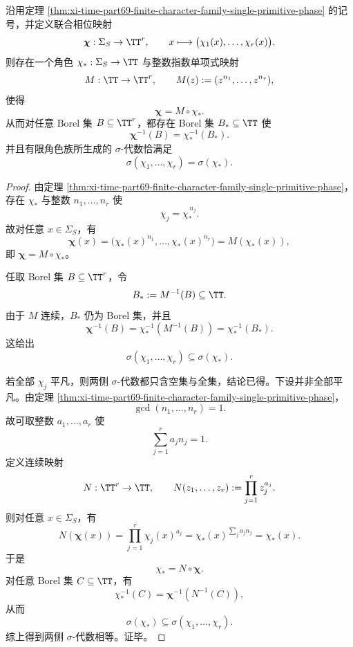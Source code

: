\begin{corollary}\label{cor:xi-time-part69-finite-phase-audit-borel-collapse-single-circle}
沿用定理 \ref{thm:xi-time-part69-finite-character-family-single-primitive-phase} 的记号，并定义联合相位映射
\[
\boldsymbol{\chi}:\Sigma_S\to \TT^r,
\qquad
x\longmapsto \bigl(\chi_1(x),\dots,\chi_r(x)\bigr).
\]
则存在一个角色 \(\chi_\ast:\Sigma_S\to\TT\) 与整数指数单项式映射
\[
M:\TT\to \TT^r,
\qquad
M(z):=(z^{n_1},\dots,z^{n_r}),
\]
使得
\[
\boldsymbol{\chi}=M\circ \chi_\ast.
\]
从而对任意 Borel 集 \(B\subseteq \TT^r\)，都存在 Borel 集 \(B_\ast\subseteq \TT\) 使
\[
\boldsymbol{\chi}^{-1}(B)=\chi_\ast^{-1}(B_\ast).
\]
并且有限角色族所生成的 \(\sigma\)-代数恰满足
\[
\sigma(\chi_1,\dots,\chi_r)=\sigma(\chi_\ast).
\]
\end{corollary}
\begin{proof}
由定理 \ref{thm:xi-time-part69-finite-character-family-single-primitive-phase}，存在 \(\chi_\ast\) 与整数 \(n_1,\dots,n_r\) 使
\[
\chi_j=\chi_\ast^{\,n_j}.
\]
故对任意 \(x\in \Sigma_S\)，有
\[
\boldsymbol{\chi}(x)
=
\bigl(\chi_\ast(x)^{n_1},\dots,\chi_\ast(x)^{n_r}\bigr)
=
M(\chi_\ast(x)),
\]
即 \(\boldsymbol{\chi}=M\circ \chi_\ast\)。

任取 Borel 集 \(B\subseteq \TT^r\)，令
\[
B_\ast:=M^{-1}(B)\subseteq \TT.
\]
由于 \(M\) 连续，\(B_\ast\) 仍为 Borel 集，并且
\[
\boldsymbol{\chi}^{-1}(B)
=
\chi_\ast^{-1}(M^{-1}(B))
=
\chi_\ast^{-1}(B_\ast).
\]
这给出
\[
\sigma(\chi_1,\dots,\chi_r)\subseteq \sigma(\chi_\ast).
\]

若全部 \(\chi_j\) 平凡，则两侧 \(\sigma\)-代数都只含空集与全集，结论已得。下设并非全部平凡。由定理 \ref{thm:xi-time-part69-finite-character-family-single-primitive-phase}，
\[
\gcd(n_1,\dots,n_r)=1.
\]
故可取整数 \(a_1,\dots,a_r\) 使
\[
\sum_{j=1}^{r}a_j n_j=1.
\]
定义连续映射
\[
N:\TT^r\to \TT,
\qquad
N(z_1,\dots,z_r):=\prod_{j=1}^{r}z_j^{a_j}.
\]
则对任意 \(x\in \Sigma_S\)，有
\[
N(\boldsymbol{\chi}(x))
=
\prod_{j=1}^{r}\chi_j(x)^{a_j}
=
\chi_\ast(x)^{\sum_j a_j n_j}
=
\chi_\ast(x).
\]
于是
\[
\chi_\ast=N\circ \boldsymbol{\chi}.
\]
对任意 Borel 集 \(C\subseteq \TT\)，有
\[
\chi_\ast^{-1}(C)=\boldsymbol{\chi}^{-1}(N^{-1}(C)),
\]
从而
\[
\sigma(\chi_\ast)\subseteq \sigma(\chi_1,\dots,\chi_r).
\]
综上得到两侧 \(\sigma\)-代数相等。证毕。
\end{proof}

